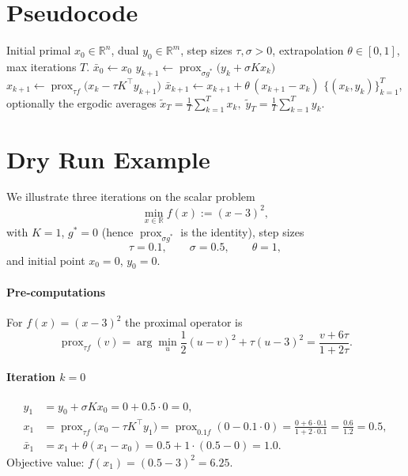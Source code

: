 \documentclass[11pt]{article}
\begin{document}
\section*{Pseudocode}
\begin{algorithm}[H]
\caption{Primal–Dual Hybrid Gradient (PDHG)}
\begin{algorithmic}[1]
\REQUIRE Initial primal $x_{0}\in\mathbb{R}^{n}$, dual $y_{0}\in\mathbb{R}^{m}$,
step sizes $\tau,\sigma>0$, extrapolation $\theta\in[0,1]$, max iterations $T$.
\STATE $\bar{x}_{0}\leftarrow x_{0}$
    \STATE $y_{k+1}\leftarrow\operatorname{prox}_{\sigma g^{*}}\!\bigl(y_{k}+\sigma Kx_{k}\bigr)$ 
    \STATE $x_{k+1}\leftarrow\operatorname{prox}_{\tau f}\!\bigl(x_{k}-\tau K^{\top}y_{k+1}\bigr)$ 
    \STATE $\bar{x}_{k+1}\leftarrow x_{k+1}+\theta\,(x_{k+1}-x_{k})$ 
\ENDFOR
\RETURN $\{(x_{k},y_{k})\}_{k=1}^{T}$, optionally the ergodic averages
$\displaystyle \tilde{x}_{T}=\frac{1}{T}\sum_{k=1}^{T}x_{k},\;
\tilde{y}_{T}=\frac{1}{T}\sum_{k=1}^{T}y_{k}$.
\end{algorithmic}
\end{algorithm}

\section*{Dry Run Example}
We illustrate three iterations on the scalar problem
\[
\min_{x\in\mathbb{R}} f(x):=(x-3)^{2},
\]
with $K=1$, $g^{*}=0$ (hence $\operatorname{prox}_{\sigma g^{*}}$ is the identity), step sizes
\[
\tau=0.1,\qquad \sigma=0.5,\qquad \theta=1,
\]
and initial point $x_{0}=0$, $y_{0}=0$.

\paragraph{Pre‑computations}
For $f(x)=(x-3)^{2}$ the proximal operator is
\[
\operatorname{prox}_{\tau f}(v)
=\arg\min_{u}\frac12(u-v)^{2}+\tau (u-3)^{2}
=\frac{v+6\tau}{1+2\tau}.
\tag{4}
\]

\paragraph{Iteration $k=0$}
\begin{align*}
y_{1}&=y_{0}+\sigma K x_{0}=0+0.5\cdot0=0,\\[4pt]
x_{1}&=\operatorname{prox}_{\tau f}\!\bigl(x_{0}-\tau K^{\top}y_{1}\bigr)
      =\operatorname{prox}_{0.1 f}(0-0.1\cdot0)
      =\frac{0+6\cdot0.1}{1+2\cdot0.1}
      =\frac{0.6}{1.2}=0.5,\\[4pt]
\bar{x}_{1}&=x_{1}+\theta(x_{1}-x_{0})=0.5+1\cdot(0.5-0)=1.0.
\end{align*}
Objective value: $f(x_{1})=(0.5-3)^{2}=6.25$.
\end{document}
